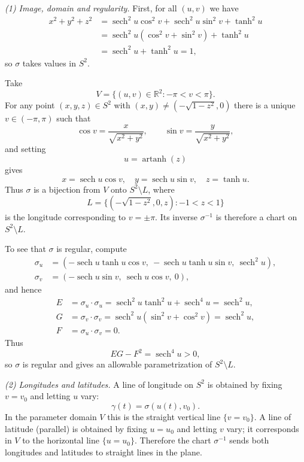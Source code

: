 \begin{solution}
\emph{(1) Image, domain and regularity.}
First, for all $(u,v)$ we have
\[
\begin{aligned}
	x^{2}+y^{2}+z^{2}
	&= \operatorname{sech}^{2}u\cos^{2}v
	+ \operatorname{sech}^{2}u\sin^{2}v + \tanh^{2}u \\
	&= \operatorname{sech}^{2}u(\cos^{2}v+\sin^{2}v) + \tanh^{2}u \\
	&= \operatorname{sech}^{2}u + \tanh^{2}u = 1,
\end{aligned}
\]
so $\sigma$ takes values in $S^{2}$.

Take
\[
V = \{(u,v)\in\mathbb{R}^{2} : -\pi < v < \pi\}.
\]
For any point $(x,y,z)\in S^{2}$ with $(x,y)\neq(-\sqrt{1-z^{2}},0)$ there is a
unique $v\in(-\pi,\pi)$ such that
\[
\cos v = \frac{x}{\sqrt{x^{2}+y^{2}}},\qquad
\sin v = \frac{y}{\sqrt{x^{2}+y^{2}}},
\]
and setting
\[
u = \operatorname{artanh}(z)
\]
gives
\[
x = \operatorname{sech}u\cos v,\quad
y = \operatorname{sech}u\sin v,\quad
z = \tanh u.
\]
Thus $\sigma$ is a bijection from $V$ onto $S^{2}\setminus L$, where
\[
L = \{(-\sqrt{1-z^{2}},0,z) : -1<z<1\}
\]
is the longitude corresponding to $v=\pm\pi$.
Its inverse $\sigma^{-1}$ is therefore a chart on $S^{2}\setminus L$.

To see that $\sigma$ is regular, compute
\[
\begin{aligned}
	\sigma_u &= (-\operatorname{sech}u\tanh u\cos v,\
	-\operatorname{sech}u\tanh u\sin v,\
	\operatorname{sech}^{2}u),\\[1mm]
	\sigma_v &= (-\operatorname{sech}u\sin v,\
	\operatorname{sech}u\cos v,\ 0),
\end{aligned}
\]
and hence
\[
\begin{aligned}
	E &= \sigma_u\cdot\sigma_u
	= \operatorname{sech}^{2}u\tanh^{2}u + \operatorname{sech}^{4}u
	= \operatorname{sech}^{2}u,\\
	G &= \sigma_v\cdot\sigma_v
	= \operatorname{sech}^{2}u(\sin^{2}v+\cos^{2}v)
	= \operatorname{sech}^{2}u,\\
	F &= \sigma_u\cdot\sigma_v = 0.
\end{aligned}
\]
Thus
\[
EG - F^{2} = \operatorname{sech}^{4}u > 0,
\]
so $\sigma$ is regular and gives an allowable parametrization of
$S^{2}\setminus L$.

\medskip
\emph{(2) Longitudes and latitudes.}
A line of longitude on $S^{2}$ is obtained by fixing $v=v_{0}$ and letting $u$
vary:
\[
\gamma(t) = \sigma(u(t),v_{0}).
\]
In the parameter domain $V$ this is the straight vertical line
$\{v=v_{0}\}$. A line of latitude (parallel) is obtained by fixing
$u=u_{0}$ and letting $v$ vary; it corresponds in $V$ to the horizontal line
$\{u=u_{0}\}$. Therefore the chart $\sigma^{-1}$ sends both longitudes and
latitudes to straight lines in the plane.


\end{solution}
